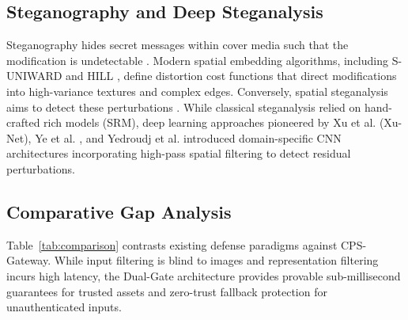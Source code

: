 \documentclass[conference]{IEEEtran}
\begin{document}
\subsection{Steganography and Deep Steganalysis}
Steganography hides secret messages within cover media such that the modification is undetectable \cite{johnson1998exploring}. Modern spatial embedding algorithms, including S-UNIWARD \cite{holub2014designing} and HILL \cite{li2014new}, define distortion cost functions that direct modifications into high-variance textures and complex edges. Conversely, spatial steganalysis aims to detect these perturbations \cite{fridrich2001detecting}. While classical steganalysis relied on hand-crafted rich models (SRM), deep learning approaches pioneered by Xu et al. \cite{xu2016structural} (Xu-Net), Ye et al. \cite{ye2017deep}, and Yedroudj et al. \cite{yedroudj2018yedroudj} introduced domain-specific CNN architectures incorporating high-pass spatial filtering to detect residual perturbations.

\subsection{Comparative Gap Analysis}
Table~\ref{tab:comparison} contrasts existing defense paradigms against CPS-Gateway. While input filtering is blind to images and representation filtering incurs high latency, the Dual-Gate architecture provides provable sub-millisecond guarantees for trusted assets and zero-trust fallback protection for unauthenticated inputs.
\end{document}
